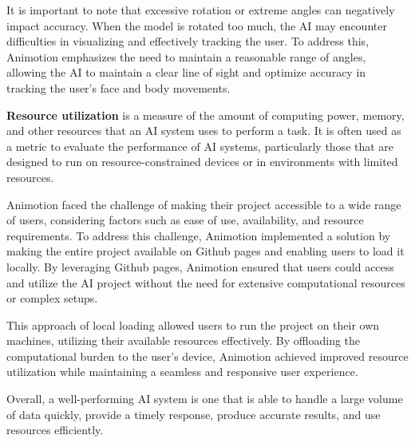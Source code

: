 It is important to note that excessive rotation or extreme angles can negatively 
impact accuracy. When the model is rotated too much, the AI may encounter difficulties in 
visualizing and effectively tracking the user. To address this, Animotion emphasizes the 
need to maintain a reasonable range of angles, allowing the AI to maintain a clear line of 
sight and optimize accuracy in tracking the user's face and body movements.

\textbf{Resource utilization} is a measure of the amount of computing power, memory, and other 
resources that an AI system uses to perform a task.
It is often used as a metric to evaluate the performance of AI systems, particularly those that 
are designed to run on resource-constrained devices or in environments with limited resources.

Animotion faced the challenge of making their project accessible to a wide range of users, 
considering factors such as ease of use, availability, and resource requirements.
To address this challenge, Animotion implemented a solution by making the entire project 
available on Github pages and enabling users to load it locally. By leveraging Github pages, 
Animotion ensured that users could access and utilize the AI project without the need for 
extensive computational resources or complex setups.

This approach of local loading allowed users to run the project on their own machines, 
utilizing their available resources effectively. By offloading the computational burden to 
the user's device, Animotion achieved improved resource utilization while maintaining a 
seamless and responsive user experience.

Overall, a well-performing AI system is one that is able to handle a 
large volume of data quickly, provide a timely response, produce accurate 
results, and use resources efficiently.